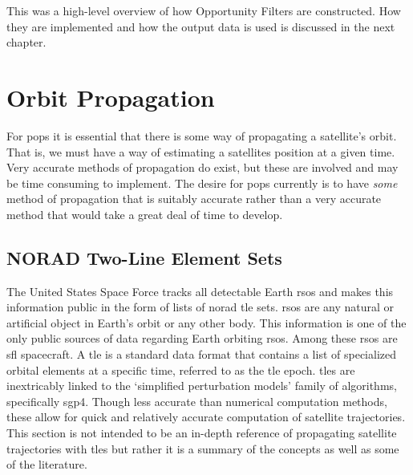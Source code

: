 This was a high-level overview of how Opportunity Filters are constructed. How
they are implemented and how the output data is used is discussed in the next
chapter.


\section{Orbit Propagation}

For \gls{pops} it is essential that there is some way of propagating a
satellite's orbit. That is, we must have a way of estimating a satellites
position at a given time. Very accurate methods of propagation do exist, but
these are involved and may be time consuming to implement. The desire for
\gls{pops} currently is to have \textit{some} method of propagation that is
suitably accurate rather than a very accurate method that would take a great
deal of time to develop.

\subsection{NORAD Two-Line Element Sets}

The United States Space Force tracks all detectable Earth \glspl{rso} and makes
this information public in the form of lists of \gls{norad} \gls{tle} sets.
\glspl{rso} are any natural or artificial object in Earth's orbit or any other
body.  This information is one of the only public sources of data regarding
Earth orbiting \glspl{rso}. Among these \glspl{rso} are \gls{sfl} spacecraft. A
\gls{tle} is a standard data format that contains a list of specialized orbital
elements at a specific time, referred to as the \gls{tle} epoch. \glspl{tle}
are inextricably linked to the `simplified perturbation models' family of
algorithms, specifically \gls{sgp4}.  Though less accurate than numerical
computation methods, these allow for quick and relatively accurate computation
of satellite trajectories.  This section is not intended to be an in-depth
reference of propagating satellite trajectories with \glspl{tle} but rather it
is a summary of the concepts as well as some of the literature.

